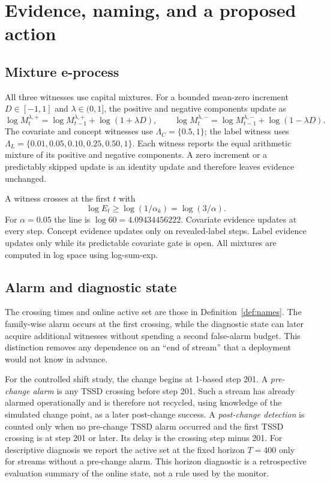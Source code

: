 \documentclass[11pt,a4paper]{article}
\theoremstyle{definition}
\newcommand{\1}{\mathbf{1}}
\begin{document}
\section{Evidence, naming, and a proposed action}
\label{sec:evidence}

\subsection{Mixture e-process}

All three witnesses use capital mixtures. For a bounded mean-zero increment $D\in[-1,1]$ and $\lambda\in(0,1]$, the positive and negative components update as
\begin{equation}
\log M_t^{\lambda,+}=\log M_{t-1}^{\lambda,+}+\log(1+\lambda D),\qquad
\log M_t^{\lambda,-}=\log M_{t-1}^{\lambda,-}+\log(1-\lambda D).
\label{eq:bet}
\end{equation}
The covariate and concept witnesses use $\Lambda_C=\{0.5,1\}$; the label witness uses $\Lambda_L=\{0.01,0.05,0.10,0.25,0.50,1\}$. Each witness reports the equal arithmetic mixture of its positive and negative components. A zero increment or a predictably skipped update is an identity update and therefore leaves evidence unchanged.

A witness crosses at the first $t$ with
\begin{equation}
\log E_t\ge\log(1/\alpha_k)=\log(3/\alpha).
\label{eq:line}
\end{equation}
For $\alpha=0.05$ the line is $\log60=4.09434456222$. Covariate evidence updates at every step. Concept evidence updates only on revealed-label steps. Label evidence updates only while its predictable covariate gate is open. All mixtures are computed in log space using log-sum-exp.

\subsection{Alarm and diagnostic state}

The crossing times and online active set are those in Definition~\ref{def:names}. The family-wise alarm occurs at the first crossing, while the diagnostic state can later acquire additional witnesses without spending a second false-alarm budget. This distinction removes any dependence on an ``end of stream'' that a deployment would not know in advance.

For the controlled shift study, the change begins at 1-based step 201. A \emph{pre-change alarm} is any TSSD crossing before step 201. Such a stream has already alarmed operationally and is therefore not recycled, using knowledge of the simulated change point, as a later post-change success. A \emph{post-change detection} is counted only when no pre-change TSSD alarm occurred and the first TSSD crossing is at step 201 or later. Its delay is the crossing step minus 201. For descriptive diagnosis we report the active set at the fixed horizon $T=400$ only for streams without a pre-change alarm. This horizon diagnostic is a retrospective evaluation summary of the online state, not a rule used by the monitor.
\end{document}
